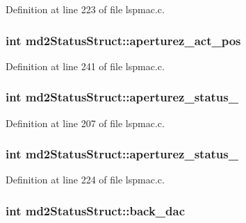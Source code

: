 Definition at line 223 of file lspmac.c.\hypertarget{structmd2StatusStruct_a62d584ce23cfd9aa626d3c03649b455c}{
\subsubsection[{aperturez\_\-act\_\-pos}]{\setlength{\rightskip}{0pt plus 5cm}int {\bf md2StatusStruct::aperturez\_\-act\_\-pos}}}
\label{structmd2StatusStruct_a62d584ce23cfd9aa626d3c03649b455c}


Definition at line 241 of file lspmac.c.\hypertarget{structmd2StatusStruct_a27880dd795e1ba4fea4870c64ee3aa84}{
\subsubsection[{aperturez\_\-status\_\-1}]{\setlength{\rightskip}{0pt plus 5cm}int {\bf md2StatusStruct::aperturez\_\-status\_}}}
\label{structmd2StatusStruct_a27880dd795e1ba4fea4870c64ee3aa84}


Definition at line 207 of file lspmac.c.\hypertarget{structmd2StatusStruct_ae407a99e428d9f4a7444a02c8bc3414e}{
\subsubsection[{aperturez\_\-status\_\-2}]{\setlength{\rightskip}{0pt plus 5cm}int {\bf md2StatusStruct::aperturez\_\-status\_}}}
\label{structmd2StatusStruct_ae407a99e428d9f4a7444a02c8bc3414e}


Definition at line 224 of file lspmac.c.\hypertarget{structmd2StatusStruct_a33ce490348c8de255cf49b96469d3d4e}{
\subsubsection[{back\_\-dac}]{\setlength{\rightskip}{0pt plus 5cm}int {\bf md2StatusStruct::back\_\-dac}}}
\label{structmd2StatusStruct_a33ce490348c8de255cf49b96469d3d4e}


